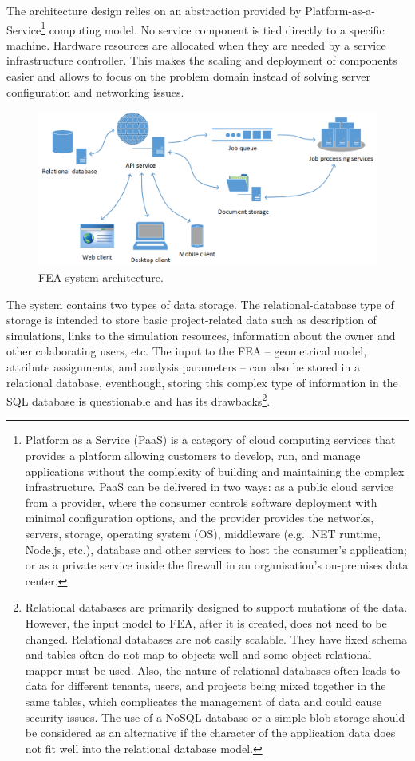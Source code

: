 The architecture design relies on an abstraction provided by Platform-as-a-Service\footnote{Platform as a Service (PaaS) is a category of cloud computing services that provides a platform allowing customers to develop, run, and manage applications without the complexity of building and maintaining the complex infrastructure. PaaS can be delivered in two ways: as a public cloud service from a provider, where the consumer controls software deployment with minimal configuration options, and the provider provides the networks, servers, storage, operating system (OS), middleware (e.g. .NET runtime, Node.js, etc.), database and other services to host the consumer's application; or as a private service inside the firewall in an organisation's on-premises data center.} computing model. No service component is tied directly to a specific machine. Hardware resources are allocated when they are needed by a service infrastructure controller. This makes the scaling and deployment of components easier and allows to focus on the problem domain instead of solving server configuration and networking issues.

\begin{figure}[H]
    \centering
    \includegraphics[width=\textwidth]{figures/chapter-data-management/FEA-architecture}
    \decoRule
    \caption{FEA system architecture.}
    \label{fig:FEA-architecture}
\end{figure}

The system contains two types of data storage. The relational-database type of storage is intended to store basic project-related data such as description of simulations, links to the simulation resources, information about the owner and other colaborating users, etc. The input to the FEA -- geometrical model, attribute assignments, and analysis parameters -- can also be stored in a relational database, eventhough, storing this complex type of information in the SQL database is questionable and has its drawbacks\footnote{Relational databases are primarily designed to support mutations of the data. However, the input model to FEA, after it is created, does not need to be changed. Relational databases are not easily scalable. They have fixed schema and tables often do not map to objects well and some object-relational mapper must be used. Also, the nature of relational databases often leads to data for different tenants, users, and projects being mixed together in the same tables, which complicates the management of data and could cause security issues. The use of a NoSQL database or a simple blob storage should be considered as an alternative if the character of the application data does not fit well into the relational database model.}.

